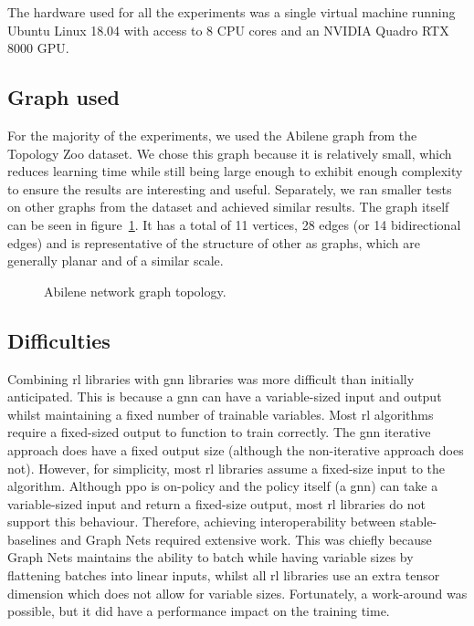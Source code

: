 The hardware used for all the experiments was a single virtual machine running Ubuntu Linux 18.04 with access to 8 CPU cores and an NVIDIA Quadro RTX 8000 GPU.

\subsection{Graph used}

For the majority of the experiments, we used the Abilene graph from the Topology Zoo dataset. We chose this graph because it is relatively small, which reduces learning time while still being large enough to exhibit enough complexity to ensure the results are interesting and useful. Separately, we ran smaller tests on other graphs from the dataset and achieved similar results. The graph itself can be seen in figure~\ref{fig:abilene}. It has a total of 11 vertices, 28 edges (or 14 bidirectional edges) and is representative of the structure of other \ac{as} graphs, which are generally planar and of a similar scale.

\begin{figure}
    \centering
    \resizebox{\textwidth}{!}{}
    \caption{Abilene network graph topology.}
    \label{fig:abilene}
\end{figure}


\subsection{Difficulties}
Combining \ac{rl} libraries with \ac{gnn} libraries was more difficult than initially anticipated. This is because a \ac{gnn} can have a variable-sized input and output whilst maintaining a fixed number of trainable variables. Most \ac{rl} algorithms require a fixed-sized output to function to train correctly. The \ac{gnn} iterative approach does have a fixed output size (although the non-iterative approach does not). However, for simplicity, most \ac{rl} libraries assume a fixed-size input to the algorithm. Although \ac{ppo} is on-policy and the policy itself (a \ac{gnn}) can take a variable-sized input and return a fixed-size output, most \ac{rl} libraries do not support this behaviour. Therefore, achieving interoperability between stable-baselines and Graph Nets required extensive work. This was chiefly because Graph Nets maintains the ability to batch while having variable sizes by flattening batches into linear inputs, whilst all \ac{rl} libraries use an extra tensor dimension which does not allow for variable sizes. Fortunately, a work-around was possible, but it did have a performance impact on the training time.


